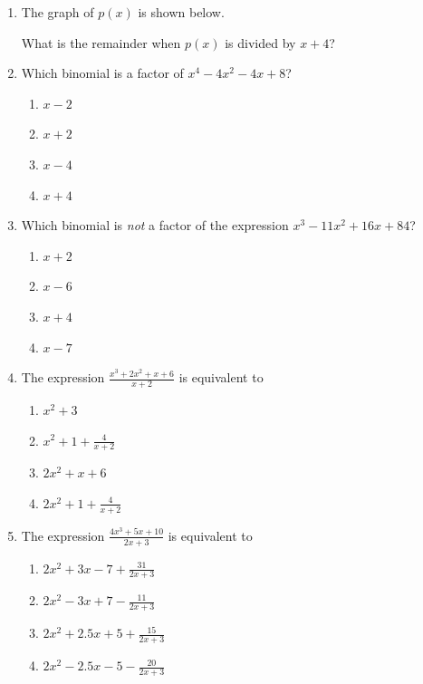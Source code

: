 \documentclass[12pt, oneside]{article}
\begin{document}
\begin{enumerate}
\item The graph of $p(x)$ is shown below.
\begin{center}
\end{center}
What is the remainder when $p(x)$ is divided by $x+4$? %

\item Which binomial is a factor of $x^4-4x^2-4x+8$?
\begin{enumerate}
    \item $x-2$
    \item $x+2$
    \item $x-4$
    \item $x+4$
\end{enumerate} %


\item Which binomial is \emph{not} a factor of the expression $x^3- 11x^2 +16x +84$?
\begin{enumerate}
    \item $x+2$
    \item $x-6$
    \item $x+4$
    \item $x-7$
\end{enumerate}

\item The expression $\displaystyle \frac{x^3+2x^2+x+6}{x+2}$ is equivalent to \begin{enumerate}
    \item $x^2+3$
    \item $\displaystyle x^2+1+\frac{4}{x+2}$
    \item $2x^2+x+6$
    \item $\displaystyle 2x^2+1+\frac{4}{x+2}$
\end{enumerate}

\item The expression $\displaystyle \frac{4x^3+5x+10}{2x+3}$ is equivalent to \begin{enumerate}
    \item $\displaystyle 2x^2+3x-7+\frac{31}{2x+3}$
    \item $\displaystyle 2x^2-3x+7-\frac{11}{2x+3}$
    \item $\displaystyle 2x^2+2.5x+5+\frac{15}{2x+3}$
    \item $\displaystyle 2x^2-2.5x-5-\frac{20}{2x+3}$
\end{enumerate} %


\end{enumerate}
\end{document}
